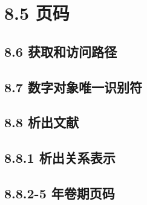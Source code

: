 \documentclass{article}
\begin{document}
\section*{8.5 页码}
\begin{refsection}
\nocite{曹凌2011-19-}
\nocite{钱学森2001--}
\nocite{冯友兰2008--}
\nocite{李约瑟1991--}
\nocite{DUBAR2013--}
\printbibliography[heading=subbibliography,title=页码示例]
\end{refsection}


\subsection*{8.6 获取和访问路径}
\begin{refsection}

\nocite{储大同2010-721-724,weiner2010-38}

\printbibliography[heading=subbibliography,title={示例}]
\end{refsection}

\subsection*{8.7 数字对象唯一识别符}
\begin{refsection}

\nocite{刘乃安2000-17-18,Deverell2013-21-22}
\printbibliography[heading=subbibliography,title={示例}]
\end{refsection}

\subsection*{8.8 析出文献}

\subsection*{8.8.1 析出关系表示}
\begin{refsection}

\nocite{姚中秋2009--,关立哲2014--,TENOPIR1987--}

\printbibliography[heading=subbibliography,title={示例}]
\end{refsection}

\subsection*{8.8.2-5 年卷期页码}
\begin{refsection}

\nocite{egdatevolnumpagea--,egdatevolnumpageb--,%
egdatevolnumpagec--,egdatevolnumpaged--,%
egdatevolnumpagee--,egdatevolnumpagef--,%
egdatevolnumpageg--}

\end{refsection}
\end{document}
